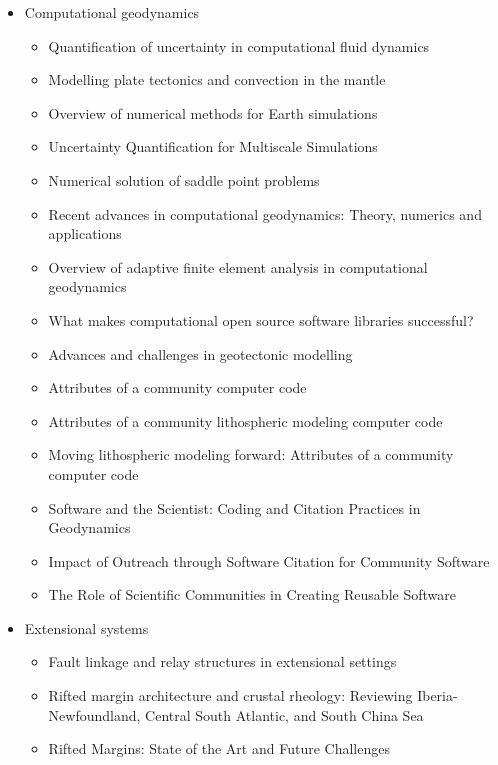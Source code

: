 \begin{itemize}
\item Computational geodynamics
   \begin{itemize}
   \item [\nineteenninetyseven] Quantification of uncertainty in computational fluid dynamics \cite{roac97}
   \item [\twothousand] Modelling plate tectonics and convection in the mantle \cite{mogz00}
   \item [\twothousandone] Overview of numerical methods for Earth simulations \cite{momd01}
   \item [\twothousandtwo] Uncertainty Quantification for Multiscale Simulations \cite{degg02}
   \item [\twothousandfive] Numerical solution of saddle point problems \cite{begl05}
   \item [\twothousandeight] Recent advances in computational geodynamics: Theory, numerics and applications \cite{kags08}
   \item [\twothousandthirteen] Overview of adaptive finite element analysis in computational geodynamics \cite{masm13}
   \item [\twothousandthirteen] What makes computational open source software libraries successful? \cite{bahe13}
   \item [\twothousandfourteen] Advances and challenges in geotectonic modelling \cite{bufy14}
   \item [\twothousandfifteen] Attributes of a community computer code \cite{comc15}
   \item [\twothousandfifteen] Attributes of a community lithospheric modeling computer code \cite{comc15}
   \item [\twothousandfifteen] Moving lithospheric modeling forward: Attributes of a community computer code \cite{comc15}
   \item [\twothousandseventeen] Software and the Scientist: Coding and Citation Practices in Geodynamics \cite{hwfs17}
   \item [\twothousandnineteen] Impact of Outreach through Software Citation for Community Software \cite{hwpc19}
   \item [\twothousandnineteen] The Role of Scientific Communities in Creating Reusable Software \cite{kehg19}
   \end{itemize}

\item Extensional systems
   \begin{itemize}
   \item [\twothousandsixteen] Fault linkage and relay structures in extensional settings \cite{foro16}
   \item [\twothousandseventeen] Rifted margin architecture and crustal rheology: Reviewing 
                Iberia-Newfoundland, Central South Atlantic, and South China Sea \cite{brhc17}
   \item [\twothousandnineteen] Rifted Margins: State of the Art and Future Challenges \cite{pema19}\\
   \end{itemize}


\end{itemize}
